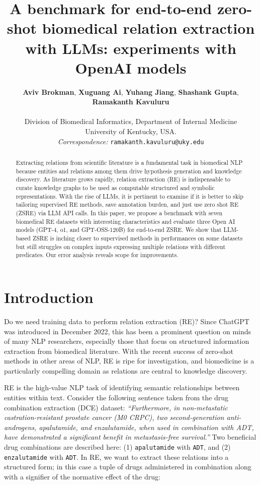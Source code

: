 \documentclass[11pt]{article}
\title{A benchmark for end-to-end zero-shot biomedical relation extraction \\ with LLMs: experiments with OpenAI models}
\author{
 \textbf{Aviv Brokman},
 \textbf{Xuguang Ai},
  \textbf{Yuhang Jiang},
  \textbf{Shashank Gupta},
  \textbf{Ramakanth Kavuluru}
\\
\\
Division of Biomedical Informatics, Department of Internal Medicine\\
University of Kentucky, USA.
\\
 \small{
    \textit{Correspondence:} \texttt{ramakanth.kavuluru@uky.edu}
}}
\begin{document}
\maketitle
\begin{abstract}

Extracting relations from scientific literature is a fundamental task in biomedical NLP because entities and relations among them drive hypothesis generation and knowledge discovery. As literature grows rapidly, relation extraction (RE) is indispensable to curate knowledge graphs to be used as computable structured and symbolic representations. With the rise of LLMs, it is pertinent to examine if it is better to skip tailoring supervised RE methods, save annotation burden, and just use zero shot RE (ZSRE) via LLM API calls. In this paper, we propose a benchmark with seven biomedical RE datasets with interesting characteristics and evaluate three Open AI models (GPT-4, o1, and GPT-OSS-120B) for end-to-end ZSRE. We show that LLM-based ZSRE is inching closer to supervised methods in performances on some datasets but still struggles on complex inputs expressing multiple relations with different predicates. Our error analysis reveals scope for improvements. 
\end{abstract}

\section{Introduction}

Do we need training data to perform relation extraction (RE)? Since ChatGPT was introduced in December 2022, this has been a prominent question on minds of many NLP researchers, especially those that focus on structured information extraction from biomedical literature. With the recent success of zero-shot methods in other areas of NLP, RE is ripe for investigation, and biomedicine is a particularly compelling domain as relations are central to knowledge discovery. 

RE is the high-value NLP task of identifying semantic relationships between entities within text. Consider the following sentence taken from the drug combination extraction (DCE) \cite{tiktinsky-etal-2022-dataset} dataset: \textit{``Furthermore, in non-metastatic castration-resistant prostate cancer (M0 CRPC), two second-generation anti-androgens, apalutamide, and enzalutamide, when used in combination with ADT, have demonstrated a significant benefit in metastasis-free survival.''}
Two beneficial drug combinations are described here: (1) \texttt{apalutamide} with \texttt{ADT}, and (2) \texttt{enzalutamide} with \texttt{ADT}. In RE, we want to extract these relations into a structured form; in this case a tuple of drugs administered in combination along with a signifier of the normative effect of the drug: 
\end{document}
